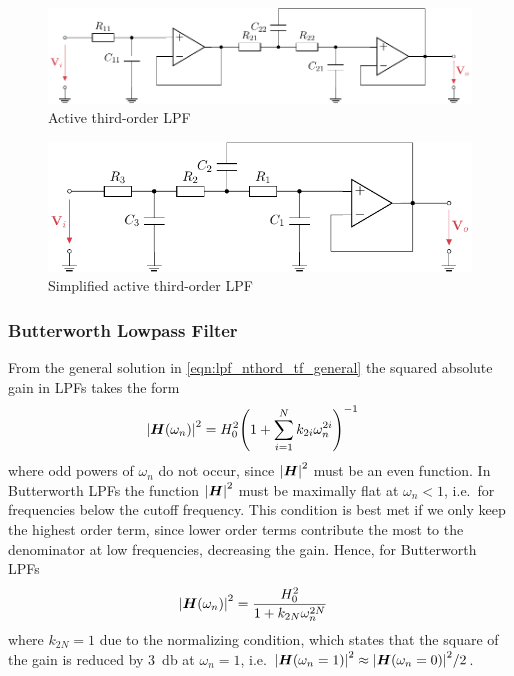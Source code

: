 \begin{figure}[!htb]
  \centering
  \includegraphics[scale=1]{figures/electronics/lowpass/lp_active_3ord_bessel/lp_active_3ord_bessel}
  \caption[Active third-order \ac{LPF}]{Active third-order \ac{LPF}%
    \label{fig:lp_active_3ord_bessel}}
\end{figure}

\begin{figure}[!htb]
  \centering
  \includegraphics[scale=1]{figures/electronics/lowpass/lp_active_3ord_bessel_simple/lp_active_3ord_bessel_simple}
  \caption[Simplified active third-order \ac{LPF}]{Simplified active third-order \ac{LPF}%
    \label{fig:lp_active_3ord_bessel_simple}}
\end{figure}


\subsubsection{Butterworth Lowpass Filter}
From the general solution in \autoref{eqn:lpf_nthord_tf_general} the squared absolute gain in \ac{LPF}s takes the form
\begin{align}
  \abs{\vect{H}(\omega_n)}^2 &= H_0^2 \pqty{1 + \sum\limits_{i=1}^N k_{2i}\omega_n^{2i}}^{-1}
\end{align}
where odd powers of $\omega_n$ do not occur, since $\abs{\bm{H}}^2$ must be an even function. In Butterworth \ac{LPF}s the function $\abs{\bm{H}}^2$ must be maximally flat at $\omega_n < 1$, i.e.\ for frequencies below the cutoff frequency. This condition is best met if we only keep the highest order term, since lower order terms contribute the most to the denominator at low frequencies, decreasing the gain. Hence, for Butterworth \ac{LPF}s
\begin{align}
  \abs{\bm{H}(\omega_n)}^2 &= \frac{H_0^2}{1+k_{2N}\omega_n^{2N}} \label{eqn:butterwoth_gain_squared}
\end{align}
where $k_{2N}=1$ due to the normalizing condition, which states that the square of the gain is reduced by \SI{3}{\decibel} at $\omega_n=1$, i.e. $\abs{\bm{H}(\omega_n=1)}^2 \approx \abs{\bm{H}(\omega_n=0)}^2/2$.


